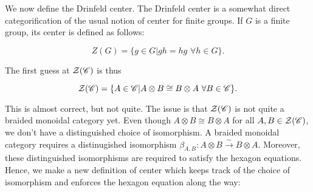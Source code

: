 We now define the Drinfeld center. The Drinfeld center is a somewhat direct categorification of the usual notion of center for finite groups. If $G$ is a finite group, its center is defined as follows:

$$Z(G)=\{g\in G | gh=hg \,\, \forall h\in G\}.$$

The first guess at $\mathcal{Z}(\mathscr{C})$ is thus

$$\mathcal{Z}(\mathscr{C})=\{A\in \mathscr{C} | A\otimes B \cong B\otimes A \,\, \forall B\in \mathscr{C}\}.$$

This is almost correct, but not quite. The issue is that $\mathcal{Z}(\mathscr{C})$ is not quite a braided monoidal category yet. Even though $A\otimes B\cong B\otimes A$ for all $A,B\in \mathcal{Z}(\mathscr{C})$, we don't have a distinguished choice of isomorphism. A braided monoidal category requires a distinugished isomorphism $\beta_{A,B}:A\otimes B\xrightarrow{\sim} B\otimes A$. Moreover, these distinguished isomorphisms are required to satisfy the hexagon equations. Hence, we make a new definition of center which keeps track of the choice of isomorphism and enforces the hexagon equation along the way:



